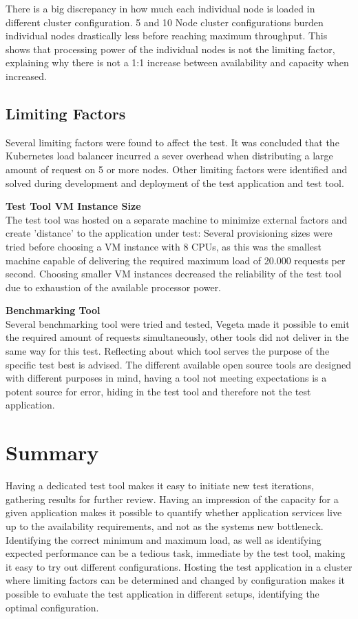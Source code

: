 There is a big discrepancy in how much each individual node is loaded in different cluster configuration. 5 and 10 Node cluster configurations burden individual nodes drastically less before reaching maximum throughput. This shows that processing power of the individual nodes is not the limiting factor, explaining why there is not a 1:1 increase between availability and capacity when increased. 

\subsection{Limiting Factors}
Several limiting factors were found to affect the test. It was concluded that the Kubernetes load balancer incurred a sever overhead when distributing a large amount of request on 5 or more nodes. Other limiting factors were identified and solved during development and deployment of the test application and test tool.

\textbf{Test Tool VM Instance Size} \\
The test tool was hosted on a separate machine to minimize external factors and create 'distance' to the application under test: Several provisioning sizes were tried before choosing a VM instance with 8 CPUs, as this was the smallest machine capable of delivering the required maximum load of 20.000 requests per second. Choosing smaller VM instances decreased the reliability of the test tool due to exhaustion of the available processor power.

\textbf{Benchmarking Tool} \\
Several benchmarking tool were tried and tested, Vegeta made it possible to emit the required amount of requests simultaneously, other tools did not deliver in the same way for this test. Reflecting about which tool serves the purpose of the specific test best is advised. The different available open source tools are designed with different purposes in mind, having a tool not meeting expectations is a potent source for error, hiding in the test tool and therefore not the test application.


\section{Summary}
Having a dedicated test tool makes it easy to initiate new test iterations, gathering results for further review. Having an impression of the capacity for a given application makes it possible to quantify whether application services live up to the availability requirements, and not as the systems new bottleneck. Identifying the correct minimum and maximum load, as well as identifying expected performance can be a tedious task, immediate by the test tool, making it easy to try out different configurations. Hosting the test application in a cluster where limiting factors can be determined and changed by configuration makes it possible to evaluate the test application in different setups, identifying the optimal configuration.

